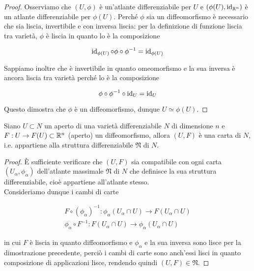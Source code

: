\begin{proof}
	Osserviamo che $ (U,\phi) $ è un'atlante differenziabile per $ U $ e $ (\phi(U),\operatorname{id}_{\mathbb{R}^{n}}) $ è un atlante differenziabile per $ \phi(U) $. Perché $ \phi $ sia un diffeomorfismo è necessario che sia liscia, invertibile e con inversa liscia: per la definizione di funzione liscia tra varietà, $ \phi $ è liscia in quanto lo è la composizione
	
	\begin{equation}
		\operatorname{id}_{\phi(U)} \circ \phi \circ \phi^{-1} = \operatorname{id}_{\phi(U)}
	\end{equation}

	Sappiamo inoltre che è invertibile in quanto omeomorfismo e la sua inversa è ancora liscia tra varietà perché lo è la composizione
	
	\begin{equation}
		\phi \circ \phi^{-1} \circ \operatorname{id}_{U} = \operatorname{id}_{U}
	\end{equation}

	Questo dimostra che $ \phi $ è un diffeomorfismo, dunque $ U \simeq \phi(U) $.
\end{proof}

\begin{definition}\label{diffeo-map}
	Siano $ U \subset N $ un aperto di una varietà differenziabile $ N $ di dimensione $ n $ e $ F : U \to F(U) \subset \mathbb{R}^{n} $ (aperto) un diffeomorfismo, allora $ (U,F) $ è una carta di $ N $, i.e. appartiene alla struttura differenziabile $ \mathfrak{N} $ di $ N $.
\end{definition}

\begin{proof}
	\`{E} sufficiente verificare che $ (U,F) $ sia compatibile con ogni carta $ (U_{\alpha},\phi_{\alpha}) $ dell'atlante massimale $ \mathfrak{N} $ di $ N $ che definisce la sua struttura differenziabile, cioè appartiene all'atlante stesso.\\
	Consideriamo dunque i cambi di carte
	
	\begin{gather}
		F \circ (\phi_{\alpha})^{-1} : \phi_{\alpha}(U_{\alpha} \cap U) \to F(U_{\alpha} \cap U)\\
		\phi_{\alpha} \circ F^{-1} : F(U_{\alpha} \cap U) \to \phi_{\alpha}(U_{\alpha} \cap U)
	\end{gather}

	in cui $ F $ è liscia in quanto diffeomorfismo e $ \phi_{\alpha} $ e la sua inversa sono lisce per la dimostrazione precedente, perciò i cambi di carte sono anch'essi lisci in quanto composizione di applicazioni lisce, rendendo quindi $ (U,F) \in \mathfrak{N} $.
\end{proof}

